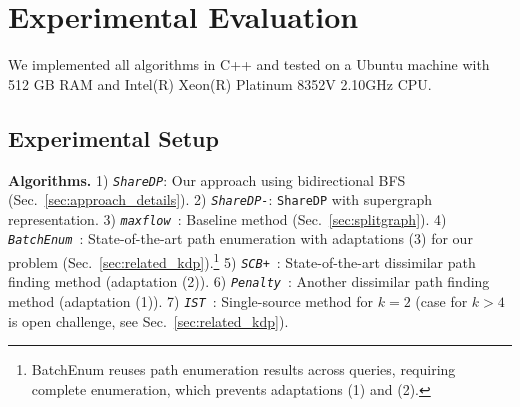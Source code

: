 \section{Experimental Evaluation}\label{sec:experiment}

We implemented all algorithms in C++ and tested on a Ubuntu machine with 512 GB RAM and Intel(R) Xeon(R) Platinum 8352V 2.10GHz CPU. 

\subsection{Experimental Setup}\label{sec:experiment_setup}

{\textbf{Algorithms.}}
1) \emph{{\texttt{ShareDP}}}: Our approach using bidirectional BFS (Sec.~\ref{sec:approach_details}).
2) \emph{{\texttt{ShareDP-}}}: \texttt{ShareDP} with supergraph representation.
3) \emph{{\texttt{maxflow}}}~\cite{baselineOnlySplitP1}: Baseline method (Sec.~\ref{sec:splitgraph}).
4) \emph{{\texttt{BatchEnum}}}~\cite{BatchEnum}: State-of-the-art path enumeration with adaptations (3) for our problem (Sec.~\ref{sec:related_kdp}).\footnote{BatchEnum reuses path enumeration results across queries, requiring complete enumeration, which prevents adaptations (1) and (2). }
5) \emph{{\texttt{SCB+}}}~\cite{SCB}: State-of-the-art dissimilar path finding method (adaptation (2)).
6) \emph{{\texttt{Penalty}}}~\cite{Penalty}: Another dissimilar path finding method (adaptation (1)).
7) \emph{\texttt{IST}}~\cite{2009BRTree}: Single-source method for \( k = 2 \) (case for $k > 4$ is open challenge, see Sec.~\ref{sec:related_kdp}).


